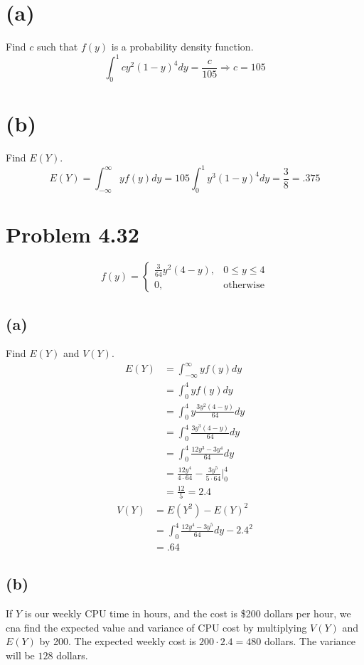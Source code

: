 \documentclass{article}
\theoremstyle{definition}
\begin{document}
    \section*{(a)}
        Find $c$ such that $f(y)$ is a probability density function.
        \[
            \int_0^1 cy^2 (1-y)^4 dy = \frac{c}{105} \Longrightarrow c = 105
        \]
    \section*{(b)}
        Find $E(Y)$.
        \[
            E(Y) = \int_{-\infty}^\infty yf(y)dy = 105 \int_{0}^1 y^3(1-y)^4dy = \frac{3}{8} = .375
        \]
\section*{Problem 4.32}
    \[
        f(y) =
        \begin{cases}
            \frac{3}{64}y^2(4-y), & 0 \leq y \leq 4\\
            0, & \text{otherwise}
        \end{cases}
    \]
    \subsection*{(a)}
        Find $E(Y)$ and $V(Y)$.
        \begin{align*}
            E(Y) &= \int_{-\infty}^\infty y f(y) dy\\
            &= \int_0^4 y f(y) dy \\
            &= \int_0^4 y\frac{3y^2(4-y)}{64} dy \\
            &= \int_0^4 \frac{3y^3(4-y)}{64} dy \\
            &= \int_0^4 \frac{12y^3 - 3y^4}{64} dy \\
            &= \frac{12y^4}{4 \cdot 64} - \frac{3y^5}{5 \cdot 64} \bigg|_0^4\\
            &= \frac{12}{5} = 2.4
        \end{align*}
        \begin{align*}
            V(Y) &= E(Y^2) - E(Y)^2\\
            &= \int_0^4 \frac{12y^4 - 3y^5}{64} dy - 2.4^2 \\
            &= .64
        \end{align*}
    \subsection*{(b)}
        If $Y$ is our weekly CPU time in hours, and the cost is \$200 dollars per hour, we cna find
        the expected value and variance of CPU cost by multiplying $V(Y)$ and $E(Y)$ by 200.
        The expected weekly cost is $200 \cdot 2.4 = 480$ dollars. The variance will be $128$ dollars.
\end{document}
